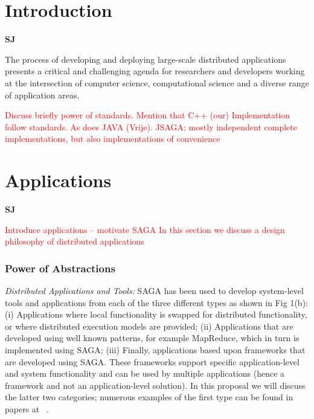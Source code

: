 \documentclass[10pt,letterpaper]{article}
\newcommand{\I}[1]{\textit{#1}}
\newcommand{\note}[1]{ {\textcolor{red}    { #1 }}}
\newcommand{\note}[1]{}
\begin{document}
\section{Introduction} {\bf SJ}

The process of developing and deploying large-scale distributed
applications presents a critical and challenging agenda for
researchers and developers working at the intersection of computer
science, computational science and a diverse range of application
areas. 

\note{Discuss briefly power of standards. Mention that C++ (our) Implementation follow standards. As does JAVA (Vrije). JSAGA; mostly independent complete implementations, but also implementations of convenience}

\section{Applications}\label{application}{\bf SJ }

\note{Introduce applications -- motivate SAGA}
\note{In this section we discuss a design philosophy of distributed applications}

\subsubsection*{Power of Abstractions}

\noindent \I{Distributed Applications and Tools:} SAGA has been used
to develop system-level tools and applications from each of the three
different types as shown in Fig 1(b): (i) Applications where local
functionality is swapped for distributed functionality, or where
distributed execution models are provided; (ii) Applications that are
developed using well known patterns, for example MapReduce, which in
turn is implemented using SAGA; (iii) Finally, applications based upon
frameworks that are developed using SAGA. These frameworks support
specific application-level and system functionality and can be used by
multiple applications (hence a framework and not an application-level
solution).  In this proposal we will discuss the latter two
categories; numerous examples of the first type can be found in papers
at ~\cite{saga_papers}.
\end{document}
